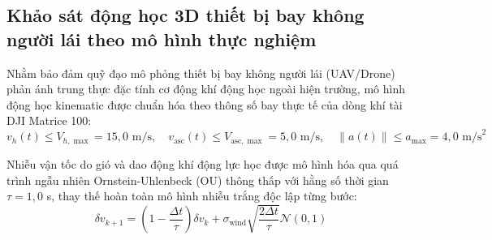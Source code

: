 \subsection{Khảo sát động học 3D thiết bị bay không người lái theo mô hình thực nghiệm}

\hspace{0.5cm} Nhằm bảo đảm quỹ đạo mô phỏng thiết bị bay không người lái (UAV/Drone) phản ánh trung thực đặc tính cơ động khí động học ngoài hiện trường, mô hình động học kinematic được chuẩn hóa theo thông số bay thực tế của dòng khí tài DJI Matrice 100:
\begin{equation}
v_h(t) \le V_{h, \max} = 15{,}0\text{ m/s}, \quad v_{\text{asc}}(t) \le V_{\text{asc}, \max} = 5{,}0\text{ m/s}, \quad \|a(t)\| \le a_{\max} = 4{,}0\text{ m/s}^2
\label{eq:uav-kinematic-bounds-formula}
\end{equation}

Nhiễu vận tốc do gió và dao động khí động lực học được mô hình hóa qua quá trình ngẫu nhiên Ornstein-Uhlenbeck (OU) thông thấp với hằng số thời gian $\tau = 1{,}0$ s, thay thế hoàn toàn mô hình nhiễu trắng độc lập từng bước:
\begin{equation}
\delta v_{k+1} = \left(1 - \frac{\Delta t}{\tau}\right) \delta v_k + \sigma_{\text{wind}} \sqrt{\frac{2 \Delta t}{\tau}} \mathcal{N}(0, 1)
\label{eq:ou-wind-velocity-filter}
\end{equation}

\begin{table}[H]
\centering
\caption{So sánh đặc tính động học và sai số bám bắt giữa mô hình nhiễu trắng và mô hình OU}
\label{tab:uav-kinematics-comparison-table}
\end{table}

